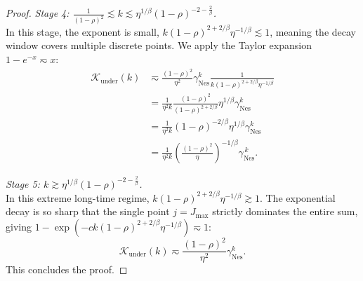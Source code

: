 \begin{proof}
\textit{Stage 4: $\frac{1}{(1-\rho)^2} \lesssim k \lesssim \eta^{1/\beta}(1-\rho)^{-2-\frac{2}{\beta}}$.} \\
In this stage, the exponent is small, $k (1-\rho)^{2+2/\beta}\eta^{-1/\beta} \lesssim 1$, meaning the decay window covers multiple discrete points. We apply the Taylor expansion $1 - e^{-x} \eqsim x$:
\begin{align*}
    \mathcal K_{\mathrm{under}}(k) 
    &\eqsim \frac{(1-\rho)^2}{\eta^2} \gamma_{\mathrm{Nes}}^k \frac{1}{k (1-\rho)^{2+2/\beta}\eta^{-1/\beta}} \\
    &= \frac{1}{\eta^2 k} \frac{(1-\rho)^2}{(1-\rho)^{2+2/\beta}} \eta^{1/\beta} \gamma_{\mathrm{Nes}}^k \\
    &= \frac{1}{\eta^2 k} (1-\rho)^{-2/\beta} \eta^{1/\beta} \gamma_{\mathrm{Nes}}^k \\
    &= \frac{1}{\eta^2 k}\left(\frac{(1-\rho)^2}{\eta}\right)^{-1/\beta}\gamma_{\mathrm{Nes}}^{\,k}.
\end{align*}

\textit{Stage 5: $k \gtrsim \eta^{1/\beta}(1-\rho)^{-2-\frac{2}{\beta}}$.} \\
In this extreme long-time regime, $k (1-\rho)^{2+2/\beta}\eta^{-1/\beta} \gtrsim 1$. The exponential decay is so sharp that the single point $j = J_{\max}$ strictly dominates the entire sum, giving $1 - \exp\left(-c k (1-\rho)^{2+2/\beta}\eta^{-1/\beta}\right) \eqsim 1$:
\[
    \mathcal K_{\mathrm{under}}(k) \eqsim \frac{(1-\rho)^2}{\eta^2} \gamma_{\mathrm{Nes}}^k.
\]
This concludes the proof.
\end{proof}

